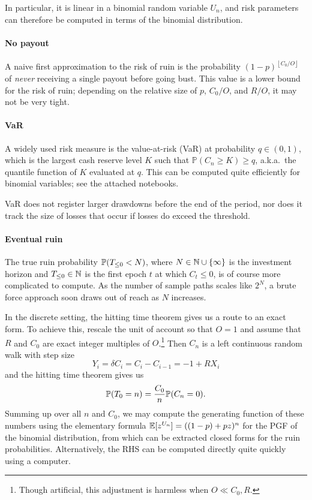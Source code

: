 In particular, it is linear in a binomial random variable $U_n$, and risk parameters can therefore be computed in terms of the binomial distribution.

\paragraph{No payout} A naive first approximation to the risk of ruin is the probability $(1-p)^{\left\lfloor C_0/O \right\rfloor}$ of \emph{never} receiving a single payout before going bust.
  This value is a lower bound for the risk of ruin; depending on the relative size of $p$, $C_0/O$, and $R/O$, it may not be very tight.

\paragraph{VaR} A widely used risk measure is the value-at-risk (VaR) at probability $q\in(0,1)$, which is the largest cash reserve level $K$ such that $\mathbb{P}(C_n\geq K)\geq q$, a.k.a.~the quantile function of $K$ evaluated at $q$.
  This can be computed quite efficiently for binomial variables; see the attached notebooks.
  
  VaR does not register larger drawdowns before the end of the period, nor does it track the size of losses that occur if losses do exceed the threshold.
  
\paragraph{Eventual ruin}
    The true ruin probability $\mathbb{P}(T_{\leq 0}<N)$, where $N\in\mathbb{N}\cup\{\infty\}$ is the investment horizon and $T_{\leq 0}\in\mathbb{N}$ is the first epoch $t$ at which $C_t\leq 0$, is of course more complicated to compute.
    As the number of sample paths scales like $2^N$, a brute force approach soon draws out of reach as $N$ increases.

    In the discrete setting, the hitting time theorem gives us a route to an exact form.
    To achieve this, rescale the unit of account so that $O=1$ and assume that $R$ and $C_0$ are exact integer multiples of $O$.\footnote{Though artificial, this adjustment is harmless when $O\ll C_0,R$.}
    Then $C_n$ is a left continuous random walk with step size 
    $$Y_i = \delta C_i = C_i - C_{i-1} = - 1 + RX_i$$ and the hitting time theorem gives us
    \[
      \mathbb{P}(T_0 = n) = \frac{C_0}{n}\mathbb{P}(C_n = 0).
    \]
    Summing up over all $n$ and $C_0$, we may compute the generating function of these numbers using the elementary formula $\mathbb{E}[z^{U_n}] = ((1-p) + pz)^n$ for the PGF of the binomial distribution, from which can be extracted closed forms for the ruin probabilities.
    Alternatively, the RHS can be computed directly quite quickly using a computer.    

